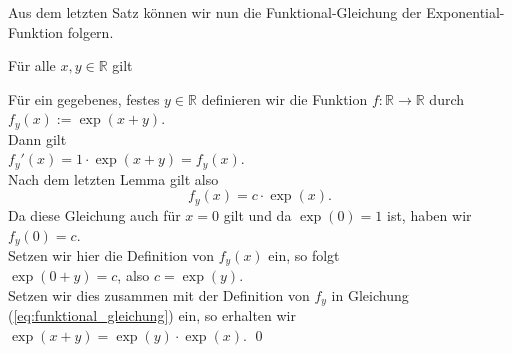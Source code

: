 Aus dem letzten Satz k\"onnen wir nun die Funktional-Gleichung der Exponential-Funktion folgern.
\begin{Satz}
  F\"ur alle $x,y \in \mathbb{R}$ gilt 
  \\[0.2cm]
  \hspace*{1.3cm}
  \colorbox{red}{}  
\end{Satz}

\proof
F\"ur ein gegebenes, festes $y \in \mathbb{R}$ definieren wir die Funktion $f:\mathbb{R} \rightarrow \mathbb{R}$
durch  
\\[0.2cm]
\hspace*{1.3cm}
$f_y(x) := \exp(x + y)$.
\\[0.2cm]
Dann gilt 
\\[0.2cm]
\hspace*{1.3cm}
$f_y'(x) = 1 \cdot \exp(x + y) = f_y(x)$.
\\[0.2cm]
Nach dem letzten Lemma gilt also 
\begin{equation}
  \label{eq:funktional_gleichung}
  f_y(x) = c \cdot \exp(x).  
\end{equation}
Da diese Gleichung auch f\"ur $x=0$ gilt und da $\exp(0) = 1$ ist, haben wir
\\[0.2cm]
\hspace*{1.3cm}
$f_y(0) = c$.
\\[0.2cm]
Setzen wir hier die Definition von $f_y(x)$ ein, so folgt
\\[0.2cm]
\hspace*{1.3cm}
$\exp(0 + y) = c$, \quad also $c = \exp(y)$.
\\[0.2cm]
Setzen wir dies zusammen mit der Definition von $f_y$ in Gleichung (\ref{eq:funktional_gleichung}) ein,
so erhalten wir
\\[0.2cm]
\hspace*{1.3cm}
$\exp(x+y) = \exp(y) \cdot \exp(x)$. \qed

